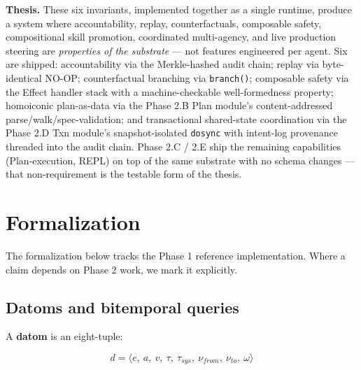 \documentclass[anon]{nesy2026}   %
\newcommand{\C}[1]{\texttt{#1}}
\begin{document}
\textbf{Thesis.} These six invariants, implemented together as a single runtime, produce a system where accountability, replay, counterfactuals, composable safety, compositional skill promotion, coordinated multi-agency, and live production steering are \emph{properties of the substrate} --- not features engineered per agent. Six are shipped: accountability via the Merkle-hashed audit chain; replay via byte-identical NO-OP; counterfactual branching via \C{branch()}; composable safety via the Effect handler stack with a machine-checkable well-formedness property; homoiconic plan-as-data via the Phase 2.B Plan module's content-addressed parse/walk/spec-validation; and transactional shared-state coordination via the Phase 2.D Txn module's snapshot-isolated \C{dosync} with intent-log provenance threaded into the audit chain. Phase 2.C / 2.E ship the remaining capabilities (Plan-execution, REPL) on top of the same substrate with no schema changes --- that non-requirement is the testable form of the thesis.

\section{Formalization}\label{sec:formal}

The formalization below tracks the Phase 1 reference implementation. Where a claim depends on Phase 2 work, we mark it explicitly.

\subsection{Datoms and bitemporal queries}\label{sec:datoms}

A \textbf{datom} is an eight-tuple:

\begin{equation}\label{eq:datom}
d = \langle e,\ a,\ v,\ \tau,\ \tau_{sys},\ \nu_{from},\ \nu_{to},\ \omega \rangle
\end{equation}
\end{document}
